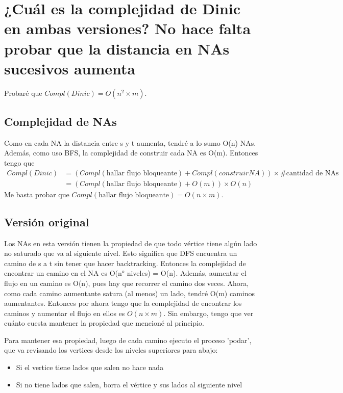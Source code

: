 \documentclass[11pt]{article}
\begin{document}
\section{¿Cuál es la complejidad de Dinic en ambas versiones? No hace falta probar que la distancia en NAs sucesivos aumenta}
\label{sec:org113f36a}
Probaré que \(Compl(Dinic) = O(n^2 \times m)\).
\subsection{Complejidad de NAs}
\label{sec:org90adac9}
Como en cada NA la distancia entre s y t aumenta, tendré a lo sumo O(n) NAs. Además, como uso BFS, la complejidad de construir cada NA es O(m).
Entonces tengo que
\begin{align*}
Compl(Dinic) & = (Compl(\text{hallar flujo bloqueante}) + Compl(construir NA)) \times \# \text{cantidad de NAs} \\
& = (Compl(\text{hallar flujo bloqueante}) + O(m)) \times O(n)
\end{align*}
Me basta probar que \(Compl(\text{hallar flujo bloqueante}) = O(n \times m)\).

\subsection{Versión original}
\label{sec:org008c303}
Los NAs en esta versión tienen la propiedad de que todo vértice tiene algún lado no saturado que va al siguiente nivel. Esto significa que DFS encuentra un camino de s a t sin tener que hacer backtracking. Entonces la complejidad de encontrar un camino en el NA es O(n° niveles) = O(n). Además, aumentar el flujo en un camino es O(n), pues hay que recorrer el camino dos veces. Ahora, como cada camino aumentante satura (al menos) un lado, tendré O(m) caminos aumentantes.
Entonces por ahora tengo que la complejidad de encontrar los caminos y aumentar el flujo en ellos es \({O(n \times m)}\). Sin embargo, tengo que ver cuánto cuesta mantener la propiedad que mencioné al principio.

Para mantener esa propiedad, luego de cada camino ejecuto el proceso 'podar', que va revisando los vertices desde los niveles superiores para abajo:
\begin{itemize}
\item Si el vertice tiene lados que salen no hace nada
\item Si no tiene lados que salen, borra el vértice y sus lados al siguiente nivel
\end{itemize}
\end{document}
